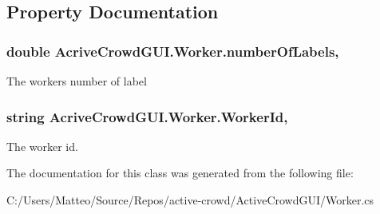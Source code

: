 \subsection{Property Documentation}
\hypertarget{class_acrive_crowd_g_u_i_1_1_worker_a88952a01ff62c123eccb375987d37b74}{}
\subsubsection[{number\+Of\+Labels}]{\setlength{\rightskip}{0pt plus 5cm}double Acrive\+Crowd\+G\+U\+I.\+Worker.\+number\+Of\+Labels\hspace{0.3cm}{\ttfamily [get]}, {\ttfamily [set]}}\label{class_acrive_crowd_g_u_i_1_1_worker_a88952a01ff62c123eccb375987d37b74}


The worker\textquotesingle{}s number of label 

\hypertarget{class_acrive_crowd_g_u_i_1_1_worker_a9efedfde6219e41d78794df6e689f846}{}
\subsubsection[{Worker\+Id}]{\setlength{\rightskip}{0pt plus 5cm}string Acrive\+Crowd\+G\+U\+I.\+Worker.\+Worker\+Id\hspace{0.3cm}{\ttfamily [get]}, {\ttfamily [set]}}\label{class_acrive_crowd_g_u_i_1_1_worker_a9efedfde6219e41d78794df6e689f846}


The worker id. 



The documentation for this class was generated from the following file\+:\begin{DoxyCompactItemize}
\item 
C\+:/\+Users/\+Matteo/\+Source/\+Repos/active-\/crowd/\+Active\+Crowd\+G\+U\+I/Worker.\+cs\end{DoxyCompactItemize}
